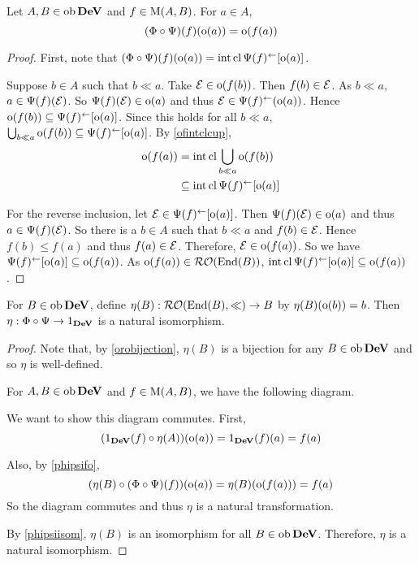 \begin{lemma}
	\label{phipsifo}
	Let \( A,B \in \operatorname{ob}{\bf{DeV}} \) and \( f \in \operatorname{M}(A,B) \).  For \( a \in A \),
	\[ (\Phi \circ \Psi)(f)(\operatorname{o}(a)) = \operatorname{o}(f(a)) \]
\end{lemma}
\begin{proof}
	First, note that \( (\Phi \circ \Psi)(f)(\operatorname{o}(a)) = \operatorname{int}\operatorname{cl}{\Psi(f)^\leftarrow}[\operatorname{o}(a)] \).
	
	Suppose \( b \in A \) such that \( b \ll a \).  Take \( \mathcal{E} \in \operatorname{o}(f(b)) \).  Then \( f(b) \in \mathcal{E} \).  As \( b \ll a \), \( a \in \Psi(f)(\mathcal{E}) \).  So \( \Psi(f)(\mathcal{E}) \in \operatorname{o}(a) \) and thus \( \mathcal{E} \in \Psi(f)^\leftarrow(\operatorname{o}(a)) \).  Hence \( \operatorname{o}(f(b)) \subseteq \Psi(f)^\leftarrow[\operatorname{o}(a)] \).  Since this holds for all \( b \ll a \), \( \bigcup_{b \ll a} \operatorname{o}(f(b)) \subseteq \Psi(f)^\leftarrow[\operatorname{o}(a)] \).  By \ref{ofintclcup},
	\begin{align*}
		\operatorname{o}(f(a)) &= \operatorname{int}\operatorname{cl}{\bigcup_{b \ll a} \operatorname{o}(f(b))} \\
		&\subseteq \operatorname{int}\operatorname{cl}{\Psi(f)^\leftarrow[\operatorname{o}(a)]}
	\end{align*}
	
	For the reverse inclusion, let \( \mathcal{E} \in \Psi(f)^\leftarrow[\operatorname{o}(a)] \).  Then \( \Psi(f)(\mathcal{E}) \in \operatorname{o}(a) \) and thus \( a \in \Psi(f)(\mathcal{E}) \).  So there is a \( b \in A \) such that \( b \ll a \) and \( f(b) \in \mathcal{E} \).  Hence \( f(b) \leq f(a) \) and thus \( f(a) \in \mathcal{E} \).  Therefore, \( \mathcal{E} \in \operatorname{o}(f(a)) \).  So we have \( \Psi(f)^\leftarrow[\operatorname{o}(a)] \subseteq \operatorname{o}(f(a)) \).  As \( \operatorname{o}(f(a)) \in \operatorname{\mathcal{RO}}(\operatorname{End}(B)) \), \( \operatorname{int}\operatorname{cl}{\Psi(f)^\leftarrow[\operatorname{o}(a)]} \subseteq \operatorname{o}(f(a)) \).
\end{proof}

\begin{theorem}
	\label{etanatiso}
	For \( B \in \operatorname{ob}{\bf{DeV}} \), define \( \eta(B): \operatorname{\mathcal{RO}}(\operatorname{End}(B),\mathord{\ll}) \to B \) by \( \eta(B)(\operatorname{o}(b)) = b \).  Then \( \eta: \Phi \circ \Psi \to 1_{\bf{DeV}} \) is a natural isomorphism.
\end{theorem}
\begin{proof}
	Note that, by \ref{orobijection}, \( \eta(B) \) is a bijection for any \( B \in \operatorname{ob}{\bf{DeV}} \) and so \( \eta \) is well-defined.
	
	For \( A,B \in \operatorname{ob}{\bf{DeV}} \) and \( f \in \operatorname{M}(A,B) \), we have the following diagram.
	
	We want to show this diagram commutes.  First,
	\[ (1_{\bf{DeV}}(f) \circ \eta(A))(\operatorname{o}(a)) = 1_{\bf{DeV}}(f)(a) = f(a) \]
	
	Also, by \ref{phipsifo},
	\[ (\eta(B) \circ (\Phi \circ \Psi)(f))(\operatorname{o}(a)) = \eta(B)(\operatorname{o}(f(a))) = f(a) \]
	So the diagram commutes and thus \( \eta \) is a natural transformation.
	
	By \ref{phipsiisom}, \( \eta(B) \) is an isomorphism for all \( B \in \operatorname{ob}{\bf{DeV}} \).  Therefore, \( \eta \) is a natural isomorphism.
\end{proof}

